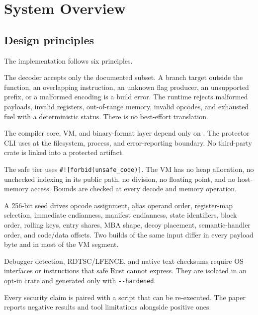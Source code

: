 \section{System Overview}
\label{sec:overview}

\subsection{Design principles}

The implementation follows six principles.

\begin{description}[leftmargin=1.4em,style=nextline]
  \item[Fail closed.] The decoder accepts only the documented subset. A branch
        target outside the function, an overlapping instruction, an unknown flag
        producer, an unsupported prefix, or a malformed encoding is a build
        error. The runtime rejects malformed payloads, invalid registers,
        out-of-range memory, invalid opcodes, and exhausted fuel with a
        deterministic status. There is no best-effort translation.
  \item[Zero shipped dependencies.] The compiler core, VM, and binary-format
        layer depend only on . The protector CLI uses  at
        the filesystem, process, and error-reporting boundary. No third-party
        crate is linked into a protected artifact.
  \item[Memory safety by construction.] The safe tier uses
        \texttt{\#![forbid(unsafe\_code)]}. The VM has no heap allocation, no
        unchecked indexing in its public path, no division, no floating point,
        and no host-memory access. Bounds are checked at every decode and memory
        operation.
  \item[Per-build diversity.] A 256-bit seed drives opcode assignment, alias
        operand order, register-map selection, immediate endianness, manifest
        endianness, state identifiers, block order, rolling keys, entry shares,
        MBA shape, decoy placement, semantic-handler order, and code/data
        offsets. Two builds of the same input differ in every payload byte and
        in most of the VM segment.
  \item[Separated unsafe boundary.] Debugger detection, RDTSC/LFENCE, and
        native text checksums require OS interfaces or instructions that safe
        Rust cannot express. They are isolated in an opt-in
         crate and generated only with \verb|--hardened|.
  \item[Evidence rather than assertion.] Every security claim is paired with a
        script that can be re-executed. The paper reports negative results and
        tool limitations alongside positive ones.
\end{description}

